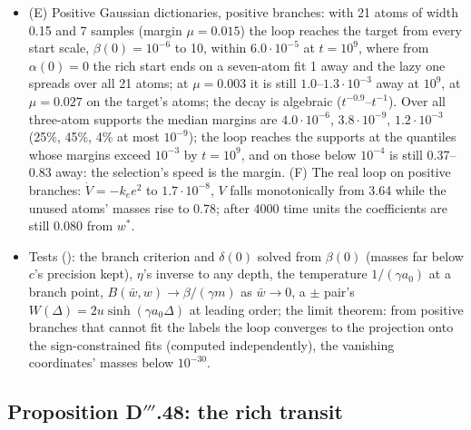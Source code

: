 \begin{itemize}
    $\varepsilon^{3/2}$. In a mixed start the free particles carry $\approx\varepsilon^2$ --- or, where the branch atoms'
    frozen signs cannot fit, 2.27 on the power scale, the projection failing at $\varepsilon = 10^{-12}$ (residual 1.95).
    (D) A $\pm$ pair per atom tends to basis pursuit weighted by $1/a_0$, slowly (slacks 0.016, 0.020): 0.29 at
    $u = 10^{-4}$, $2.6\cdot10^{-4}$ at $10^{-128}$, $1.9\cdot10^{-6}$ at $10^{-256}$; never are both members of an atom
    active.
  \item (E) Positive Gaussian dictionaries, positive branches: with 21 atoms of width 0.15 and 7 samples (margin
    $\mu = 0.015$) the loop reaches the target from every start scale, $\beta(0) = 10^{-6}$ to 10, within
    $6.0\cdot10^{-5}$ at $t = 10^9$, where from $\alpha(0) = 0$ the rich start ends on a seven-atom fit 1 away and the
    lazy one spreads over all 21 atoms; at $\mu = 0.003$ it is still $1.0$--$1.3\cdot10^{-3}$ away at $10^9$, at
    $\mu = 0.027$ on the target's atoms; the decay is algebraic ($t^{-0.9}$--$t^{-1}$). Over all three-atom supports the
    median margins are $4.0\cdot10^{-6}$, $3.8\cdot10^{-9}$, $1.2\cdot10^{-3}$ (25\%, 45\%, 4\% at most $10^{-9}$); the
    loop reaches the supports at the quantiles whose margins exceed $10^{-3}$ by $t = 10^9$, and on those below $10^{-4}$
    is still 0.37--0.83 away: the selection's speed is the margin. (F) The real loop on positive branches:
    $\dot V = -k_ee^2$ to $1.7\cdot10^{-8}$, $V$ falls monotonically from 3.64 while the unused atoms' masses rise to
    0.78; after 4000 time units the coefficients are still 0.080 from $w^*$.
  \item Tests (): the branch criterion and $\delta(0)$ solved from $\beta(0)$ (masses far
    below $c$'s precision kept), $\eta$'s inverse to any depth, the temperature $1/(\gamma a_0)$ at a branch point,
    $B(\bar w,w)\to\beta/(\gamma m)$ as $\bar w\to0$, a $\pm$ pair's $W(\Delta) = 2u\sinh(\gamma a_0\Delta)$ at leading
    order; the limit theorem: from positive branches that cannot fit the labels the loop converges to the projection onto
    the sign-constrained fits (computed independently), the vanishing coordinates' masses below $10^{-30}$.
\end{itemize}

\subsection{Proposition D\texorpdfstring{$'''$}{'''}.48: the rich transit}

